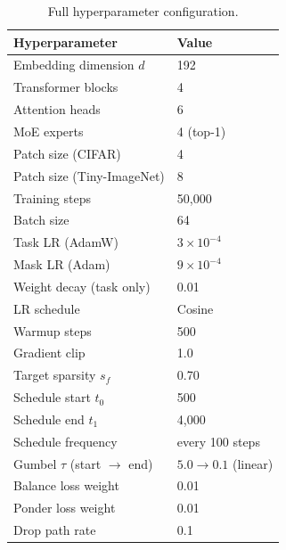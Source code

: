 \begin{table}[h]
\centering
\caption{Full hyperparameter configuration.}
\label{tab:hyperparams}
\small
\begin{tabular}{ll}
\toprule
\textbf{Hyperparameter} & \textbf{Value} \\
\midrule
Embedding dimension $d$ & 192 \\
Transformer blocks & 4 \\
Attention heads & 6 \\
MoE experts & 4 (top-1) \\
Patch size (CIFAR) & 4 \\
Patch size (Tiny-ImageNet) & 8 \\
\midrule
Training steps & 50{,}000 \\
Batch size & 64 \\
Task LR (AdamW) & $3 \times 10^{-4}$ \\
Mask LR (Adam) & $9 \times 10^{-4}$ \\
Weight decay (task only) & 0.01 \\
LR schedule & Cosine \\
Warmup steps & 500 \\
Gradient clip & 1.0 \\
\midrule
Target sparsity $s_f$ & 0.70 \\
Schedule start $t_0$ & 500 \\
Schedule end $t_1$ & 4{,}000 \\
Schedule frequency & every 100 steps \\
Gumbel $\tau$ (start $\to$ end) & $5.0 \to 0.1$ (linear) \\
Balance loss weight & 0.01 \\
Ponder loss weight & 0.01 \\
Drop path rate & 0.1 \\
\bottomrule
\end{tabular}
\end{table}
